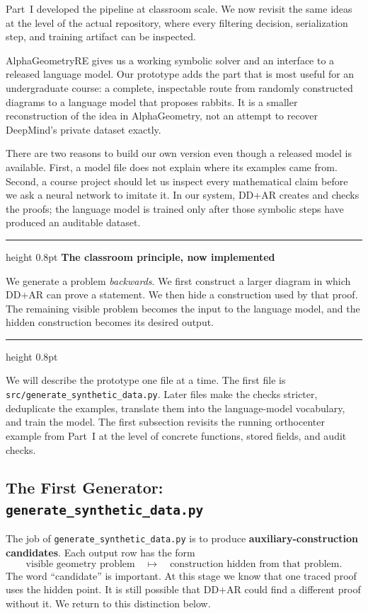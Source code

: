 \documentclass[reqno]{amsart}
\newenvironment{lecturebox}[1]{%
    \par\medskip
    \noindent\begingroup
    \setlength{\parindent}{0pt}
    \color{agblue}\hrule height 0.8pt\color{black}
    \smallskip
    \textbf{\color{agblue}#1}\par\smallskip
}{%
    \smallskip
    \color{agblue}\hrule height 0.8pt\color{black}
    \endgroup
    \medskip
}
\newcommand{\keyterm}[1]{\textbf{\color{agblue}#1}}
\DeclareMathOperator{\1}{\textbf{1}}
\begin{document}
Part~I developed the pipeline at classroom scale. We now revisit the same
ideas at the level of the actual repository, where every filtering decision,
serialization step, and training artifact can be inspected.

AlphaGeometryRE gives us a working symbolic solver and an interface to a
released language model. Our prototype adds the part that is most useful for
an undergraduate course: a complete, inspectable route from randomly
constructed diagrams to a language model that proposes rabbits. It is a
smaller reconstruction of the idea in AlphaGeometry, not an attempt to recover
DeepMind's private dataset exactly.

There are two reasons to build our own version even though a released model is
available. First, a model file does not explain where its examples came from.
Second, a course project should let us inspect every mathematical claim before
we ask a neural network to imitate it. In our system, DD+AR creates and checks
the proofs; the language model is trained only after those symbolic steps have
produced an auditable dataset.

\begin{lecturebox}{The classroom principle, now implemented}
We generate a problem \emph{backwards}. We first construct a larger diagram in
which DD+AR can prove a statement. We then hide a construction used by that
proof. The remaining visible problem becomes the input to the language model,
and the hidden construction becomes its desired output.
\end{lecturebox}

We will describe the prototype one file at a time. The first file is
\verb|src/generate_synthetic_data.py|. Later files make the checks stricter,
deduplicate the examples, translate them into the language-model vocabulary,
and train the model. The first subsection revisits the running orthocenter
example from Part~I at the level of concrete functions, stored fields, and
audit checks.

\subsection{The First Generator: \texttt{generate\_synthetic\_data.py}}
\label{sec: generate synthetic data.py}

The job of \verb|generate_synthetic_data.py| is to produce
\keyterm{auxiliary-construction candidates}. Each output row has the form
\[
  \text{visible geometry problem}
  \quad\longmapsto\quad
  \text{construction hidden from that problem}.
\]
The word ``candidate'' is important. At this stage we know that one traced
proof uses the hidden point. It is still possible that DD+AR could find a
different proof without it. We return to this distinction below.
\end{document}
